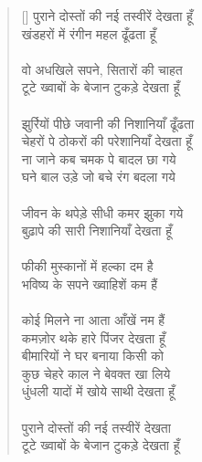 \begin{verse}[\versewidth]\texthindi{
पुराने दोस्तों की नई तस्वीरें देखता हूँ\\
खंडहरों में रंगीन महल ढूँढता हूँ\\
\\
वो अधखिले सपने, सितारों की चाहत\\
टूटे ख्वाबों के बेजान टुकड़े देखता हूँ\\
\\
झुर्रियों पीछे जवानी की निशानियाँ ढूँढता\\
चेहरों पे ठोकरों की परेशानियाँ देखता हूँ\\
ना जाने कब चमक पे बादल छा गये\\
घने बाल उड़े जो बचे रंग बदला गये\\
\\
जीवन के थपेड़े सीधी कमर झुका गये\\
बुढ़ापे की सारी निशानियाँ देखता हूँ\\
\\
फीकी मुस्कानों में हल्का दम है\\
भविष्य के सपने ख्वाहिशें कम हैं\\
\\
कोई मिलने ना आता आँखें नम हैं\\
कमज़ोर थके हारे पिंजर देखता हूँ\\
बीमारियों ने घर बनाया किसी को\\
कुछ चेहरे काल ने बेवक्त खा लिये\\
धुंधली यादों में खोये साथी देखता हूँ\\
\\
पुराने दोस्तों की नई तस्वीरें देखता\\
टूटे ख्वाबों के बेजान टुकड़े देखता हूँ
}\end{verse}


